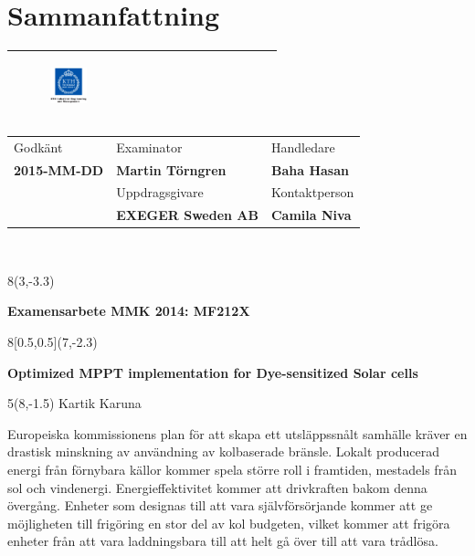 \chapter*{Sammanfattning}
\thispagestyle{begin}

\begin{tabular}{ | p{\dimexpr \linewidth-2\tabcolsep} |} \hline
 \begin{figure}[H]
        
        \includegraphics[width=0.2\textwidth]{images/indust} 
             \end{figure}  \\\hline
\end{tabular}   
\begin{tabular}{ | p{} |
                  p{} |
                  p{} |} \hline
                 Godkänt & Examinator & Handledare \\
                  \textbf{2015-MM-DD}  & \textbf{Martin Törngren} & \textbf{Baha Hasan} \\\hline
                   & Uppdragsgivare & Kontaktperson \\
                   & \textbf{EXEGER Sweden AB} & \textbf{Camila Niva}\\ \hline
\end{tabular} \\
\begin{textblock}{8}(3,-3.3)
\begin{center}
\textbf{Examensarbete MMK 2014: MF212X }
\end{center}
\end{textblock}
\begin{textblock}{8}[0.5,0.5](7,-2.3)
\begin{center}
\textbf{Optimized MPPT implementation for Dye-sensitized Solar cells}
\end{center}
\end{textblock}
\begin{textblock}{5}(8,-1.5)
Kartik Karuna
\end{textblock}
Europeiska kommissionens plan för att skapa ett utsläppssnålt samhälle kräver en drastisk minskning av användning av kolbaserade bränsle. Lokalt producerad energi från förnybara källor kommer spela större roll i framtiden, mestadels från sol och vindenergi. Energieffektivitet kommer att drivkraften bakom denna övergång. Enheter som designas till att vara självförsörjande kommer att ge möjligheten till frigöring en stor del av kol budgeten, vilket kommer att frigöra enheter från att vara laddningsbara till att helt gå över till att vara trådlösa.\\

